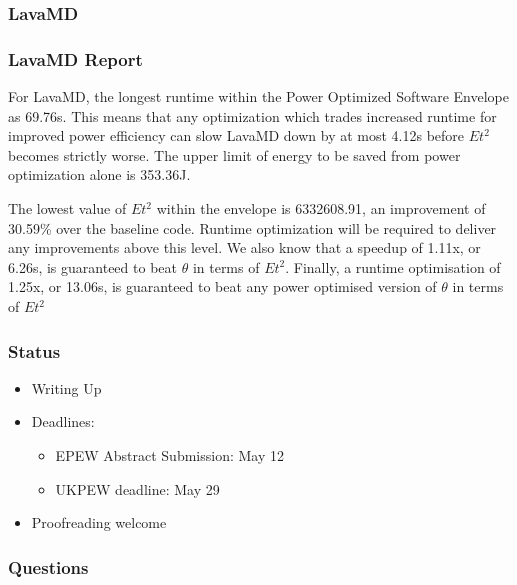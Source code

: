 \documentclass{beamer}
\begin{document}
  \begin{frame}
    \frametitle{LavaMD}
    \begin{figure}
    \providecommand{\plotwidth}{.8\linewidth}
    
    \end{figure}
  \end{frame}
  \begin{frame}
    \frametitle{LavaMD Report}
For LavaMD, the longest runtime within the Power Optimized Software Envelope as 69.76s.
This means that any optimization which trades increased runtime for improved power efficiency can slow LavaMD down by at most 4.12s before $Et^2$ becomes strictly worse.
The upper limit of energy to be saved from power optimization alone is 353.36J.

The lowest value of $Et^2$ within the envelope is 6332608.91, an improvement of 30.59\% over the baseline code.
Runtime optimization will be required to deliver any improvements above this level.
We also know that a speedup of 1.11x, or 6.26s, is guaranteed to beat $\theta$ in terms of $Et^2$.
Finally, a runtime optimisation of 1.25x, or 13.06s, is guaranteed to beat any power optimised version of $\theta$ in terms of $Et^2$ 
\end{frame}

  \begin{frame}
    \frametitle{Status}
    \begin{itemize}
    \item Writing Up
    \item Deadlines:
    \begin{itemize}
      \item EPEW Abstract Submission: May 12 
      \item UKPEW deadline: May 29
    \end{itemize}
    \item Proofreading welcome
    \end{itemize}
  \end{frame}


  \begin{frame}
    \frametitle{Questions}
  \end{frame}
\end{document}
